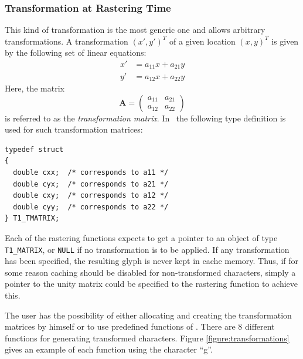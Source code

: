 \subsubsection{Transformation at Rastering Time}
This kind of transformation is the most generic one and allows arbitrary
transformations. A transformation $(x',y')^T$ of a given location $(x,y)^T$ is
given by the following set of linear equations:
\begin{eqnarray*}
x' & = a_{11} x + a_{21} y \\
y' & = a_{12} x + a_{22} y 
\end{eqnarray*}
Here, the matrix 
\begin{displaymath}
\mathbf{A}=
\left( 
\begin{array}{cc}
a_{11} & a_{21} \\
a_{12} & a_{22}
\end{array}
\right)
\end{displaymath}
is referred to as the {\em transformation matrix}. In \tonelib\ the following
type definition is used for such transformation matrices:
\begin{verbatim}
typedef struct
{
  double cxx;  /* corresponds to a11 */
  double cyx;  /* corresponds to a21 */
  double cxy;  /* corresponds to a12 */
  double cyy;  /* corresponds to a22 */
} T1_TMATRIX;
\end{verbatim}
Each of the rastering functions expects to get a pointer to an object of type
\verb+T1_MATRIX+, or \verb+NULL+ if no transformation is to be applied. 
If any transformation has been specified, the resulting glyph is never kept in
cache memory. Thus, if for some reason caching should be disabled for
non-transformed characters, simply a pointer to the
unity matrix 
could be specified to the rastering function to achieve this.

The user has the possibility of either allocating and creating the
transformation matrices by himself or to use predefined functions of
\tonelib. There are 8 different functions for generating transformed
characters. Figure \ref{figure:transformations} gives an example of each
function using the character ``g''. 

